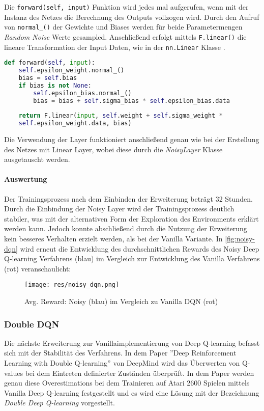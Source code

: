 \documentclass[11pt]{scrartcl}
\begin{document}
Die \lstinline!forward(self, input)! Funktion wird jedes mal aufgerufen, wenn mit der Instanz
des Netzes die Berechnung des Outputs vollzogen wird. Durch den Aufruf von 
\lstinline!normal_()! der Gewichte und Biases werden für beide Parametermengen 
\textit{Random Noise} Werte gesampled. Anschließend erfolgt mittels \lstinline!F.linear()!
die lineare Transformation der Input Daten, wie in der \lstinline!nn.Linear! Klasse 
\cite[~S.179 ff.]{L2018}.

\begin{lstlisting}[language=Python, caption=\textit{forward()} Funktion Noisy Layer, 
label=lst:noisy_forward]
	def forward(self, input):
	self.epsilon_weight.normal_()
	bias = self.bias
	if bias is not None:
	    self.epsilon_bias.normal_()
	    bias = bias + self.sigma_bias * self.epsilon_bias.data
		
	return F.linear(input, self.weight + self.sigma_weight *
	self.epsilon_weight.data, bias)
\end{lstlisting}

Die Verwendung der Layer funktioniert anschließend genau wie bei der Erstellung des Netzes mit
Linear Layer, wobei diese durch die \textit{NoisyLayer} Klasse ausgetauscht werden.

\paragraph*{Auswertung}
\noindent
\newline
Der Trainingsprozess nach dem Einbinden der Erweiterung beträgt 32 Stunden. %
Durch die Einbindung der Noisy Layer wird der Trainingsprozess deutlich stabiler, was mit der
alternativen Form der Exploration des Environments erklärt werden kann. Jedoch konnte
abschließend durch die Nutzung der Erweiterung kein besseres Verhalten erzielt werden, als
bei der Vanilla Variante. In \autoref{fig:noisy-dqn} wird erneut die Entwicklung des
durchschnittlichen Rewards des Noisy Deep Q-learning Verfahrens (blau) im Vergleich zur
Entwicklung des Vanilla Verfahrens (rot) veranschaulicht:

\begin{figure}[htp]
\centering
\texttt{[image: res/noisy\_dqn.png]}
\caption{Avg. Reward: Noisy (blau) im Vergleich zu Vanilla DQN (rot)}
\label{fig:noisy-dqn}
\end{figure}

\subsubsection{Double DQN}
Die nächste Erweiterung zur Vanillaimplementierung von Deep Q-learning befasst sich mit der
Stabilität des Verfahrens. In dem Paper ''Deep Reinforcement Learning with Double Q-learning''
von DeepMind\cite{HGD2015} wird das Überwerten von Q-values bei dem Eintreten definierter
Zuständen überprüft. In dem Paper werden genau diese Overestimations bei dem Trainieren auf
Atari 2600 Spielen mittels Vanilla Deep Q-learning festgestellt und es wird eine Lösung mit
der Bezeichnung \textit{Double Deep Q-learning} vorgestellt.
\end{document}
